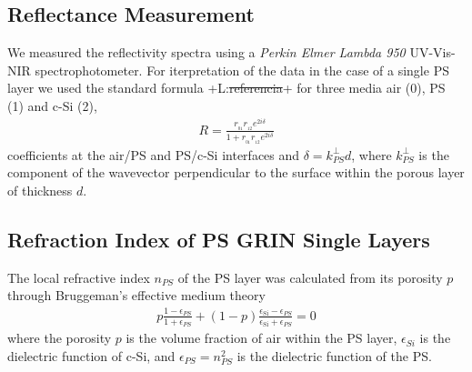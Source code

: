 \documentclass{article}
\newcommand{\notaL}[1]{{\color{blue}+L:#1+}}
\begin{document}
\subsection{Reflectance Measurement}
\label{sec:refl-meas}
We measured the reflectivity spectra using a {\em Perkin Elmer Lambda 950}
UV-Vis-NIR spectrophotometer. For iterpretation of the data in the
case of a single PS layer we used
the standard formula \cite{T8,T9} \notaL{\sout{referencia}} for three media air (0), PS
(1) and c-Si (2),
 \begin{eqnarray}\label{Eq:ECMR}
   R=\frac{r _ {_ {01}}r _ {_ {12}} e^{2i\delta}}{1+r _ {_ {01}}r _ {_ {12}} e^{2i\delta}}
\end{eqnarray}
coefficients at the air/PS and PS/c-Si interfaces \cite{T10,T11}
and $\delta=k_{PS}^\perp d$, where $k_{PS}^\perp$ is
the component of the wavevector perpendicular to the surface within
the porous layer of thickness $d$.


\subsection{Refraction Index of PS GRIN Single Layers}
\label{sec:refraction-index-ps}
The local refractive index $n_{PS}$ of the PS layer was calculated from its
porosity $p$ through
Bruggeman's effective medium theory \cite{I20}
\begin{eqnarray}\label{Eq:Brugg}
 p\frac{1-\epsilon_{PS}} {1+\epsilon_{PS}} + (1-p)
  \frac{\epsilon_{\text{Si}} - \epsilon_{PS}}
  {\epsilon_{\text{Si}}+\epsilon_{PS}}=0
\end{eqnarray}
where the porosity $p$ is the volume fraction of air within the PS
layer, $\epsilon_{Si}$ is the dielectric function of c-Si, and
$\epsilon_{PS}=n_{PS}^2$ is the dielectric function of the PS.
\end{document}
